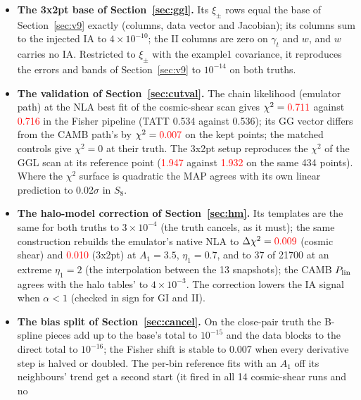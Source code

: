 \documentclass[11pt]{article}
\newif\ifnumbersfinal
\newcommand{\refresh}[1]{\ifnumbersfinal#1\else\textcolor{red}{#1}\fi}
\newcommand{\CVchiNLA}{\refresh{0.711}}
\newcommand{\CVchiNLAref}{\refresh{0.716}}
\newcommand{\CVchiGG}{\refresh{0.007}}
\newcommand{\CVchiThree}{\refresh{1.947}}
\newcommand{\CVchiThreeRef}{\refresh{1.932}}
\newcommand{\HMchkCS}{\refresh{0.009}}
\newcommand{\HMchkThree}{\refresh{0.010}}
\begin{document}
\begin{itemize}
    residual precision annihilates the template, has rank $n - 2$ and
    reaches its Woodbury limit; a matched prior gives $\eta = 1$
    exactly; coverages and the 95\% probability match Monte Carlo to
    0.003. All 46 checks are in \texttt{verify\_ia\_fisher.py}.
  \item \textbf{The 3x2pt base of Section~\ref{sec:ggl}.} Its $\xi_\pm$
    rows equal the base of Section~\ref{sec:v9} exactly (columns, data
    vector and Jacobian); its columns sum to the injected IA to
    $4\times10^{-10}$; the II columns are zero on $\gamma_t$ and $w$, and
    $w$ carries no IA. Restricted to $\xi_\pm$ with the example1
    covariance, it reproduces the errors and bands of
    Section~\ref{sec:v9} to $10^{-14}$ on both truths.
  \item \textbf{The validation of Section~\ref{sec:cutval}.} The chain
    likelihood (emulator path) at the NLA best fit of the cosmic-shear scan
    gives $\chi^2 = \CVchiNLA$ against \CVchiNLAref{} in the Fisher pipeline
    (TATT 0.534 against 0.536); its GG vector differs from the CAMB path's
    by $\chi^2 = \CVchiGG$ on the kept points; the matched controls give
    $\chi^2 = 0$ at their truth. The 3x2pt setup reproduces the $\chi^2$ of
    the GGL scan at its reference point (\CVchiThree{} against
    \CVchiThreeRef{} on the same 434 points). Where the $\chi^2$ surface is
    quadratic the MAP agrees with its own linear prediction to 0.02$\sigma$
    in $S_8$.
  \item \textbf{The halo-model correction of Section~\ref{sec:hm}.} Its
    templates are the same for both truths to $3\times10^{-4}$ (the truth
    cancels, as it must); the same construction rebuilds the emulator's
    native NLA to $\Delta\chi^2 = \HMchkCS$ (cosmic shear) and \HMchkThree{}
    (3x2pt) at $A_1 = 3.5$, $\eta_1 = 0.7$, and to 37 of 21700 at an extreme
    $\eta_1 = 2$ (the interpolation between the 13 snapshots); the CAMB
    $P_{\rm lin}$ agrees with the halo tables' to $4\times10^{-3}$. The
    correction lowers the IA signal when $\alpha < 1$ (checked in sign for GI
    and II).
  \item \textbf{The bias split of Section~\ref{sec:cancel}.} On the
    close-pair truth the B-spline pieces add up to the base's total to
    $10^{-15}$ and the data blocks to the direct total to $10^{-16}$; the
    Fisher shift is stable to 0.007 when every derivative step is halved or
    doubled. The per-bin reference fits with an $A_1$ off its neighbours'
    trend get a second start (it fired in all 14 cosmic-shear runs and no

\end{itemize}
\end{document}
